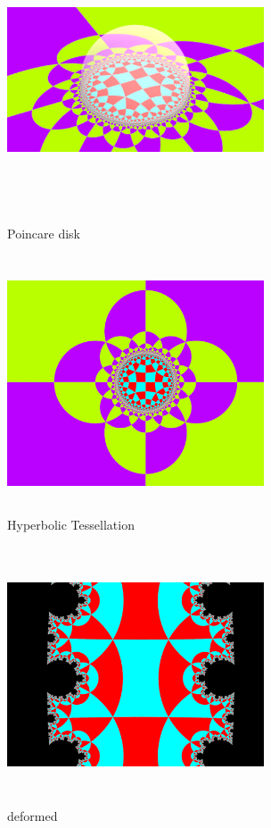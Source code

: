 \begin{figure}[h!tbp]
 \begin{minipage}{0.49\hsize}
   \begin{center}
    \includegraphics[width=3in, height=3in, keepaspectratio]{../img/tessellation/poincare.pdf}
    \caption{Poincare disk}
    \label{fig:poincare}
   \end{center}
 \end{minipage}
 \hspace*{\fill}
 \begin{minipage}{0.49\hsize}
   \begin{center}
    \includegraphics[width=3in, height=3in, keepaspectratio]{../img/tessellation/outer.pdf}
    \caption{Hyperbolic Tessellation}
    \label{fig:outer}
   \end{center}
 \end{minipage}
\end{figure}


\begin{figure}[htbp]
 \begin{center}
      \includegraphics[width=3in, height=3in, keepaspectratio]{../img/tessellation/deformedTessellation.pdf}
    \caption{deformed}
    \label{fig:deformed}
 \end{center}
\end{figure}
